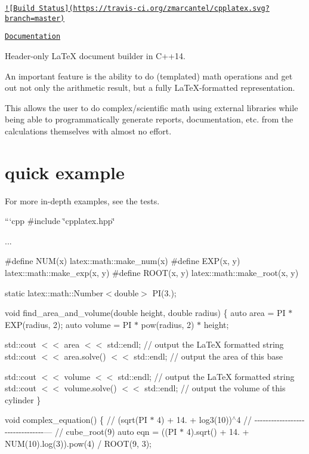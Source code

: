 \href{https://travis-ci.org/zmarcantel/cpplatex}{\tt !\mbox{[}Build Status\mbox{]}(https\-://travis-\/ci.\-org/zmarcantel/cpplatex.\-svg?branch=master)}

\href{https://zmarcantel.github.io/cpplatex}{\tt Documentation}

Header-\/only {\ttfamily La\-Te\-X} document builder in C++14.

An important feature is the ability to do (templated) math operations and get out not only the arithmetic result, but a fully {\ttfamily La\-Te\-X}-\/formatted representation.

This allows the user to do complex/scientific math using external libraries while being able to programmatically generate reports, documentation, etc. from the calculations themselves with almost no effort.

\section*{quick example}

For more in-\/depth examples, see the tests.

```cpp \#include \char`\"{}cpplatex.\-hpp\char`\"{}

...

\#define N\-U\-M(x) latex\-::math\-::make\-\_\-num(x) \#define E\-X\-P(x, y) latex\-::math\-::make\-\_\-exp(x, y) \#define R\-O\-O\-T(x, y) latex\-::math\-::make\-\_\-root(x, y)

static latex\-::math\-::\-Number$<$double$>$ P\-I(3.);

void find\-\_\-area\-\_\-and\-\_\-volume(double height, double radius) \{ auto area = P\-I $\ast$ E\-X\-P(radius, 2); auto volume = P\-I $\ast$ pow(radius, 2) $\ast$ height;

std\-::cout $<$$<$ area $<$$<$ std\-::endl; // output the La\-Te\-X formatted string std\-::cout $<$$<$ area.\-solve() $<$$<$ std\-::endl; // output the area of this base

std\-::cout $<$$<$ volume $<$$<$ std\-::endl; // output the La\-Te\-X formatted string std\-::cout $<$$<$ volume.\-solve() $<$$<$ std\-::endl; // output the volume of this cylinder \}

void complex\-\_\-equation() \{ // (sqrt(\-P\-I $\ast$ 4) + 14. + log3(10))$^\wedge$4 // -\/-\/-\/-\/-\/-\/-\/-\/-\/-\/-\/-\/-\/-\/-\/-\/-\/-\/-\/-\/-\/-\/-\/-\/-\/-\/-\/-\/-\/-\/-\/-\/--- // cube\-\_\-root(9) auto eqn = ((P\-I $\ast$ 4).sqrt() + 14. + N\-U\-M(10).log(3)).pow(4) / R\-O\-O\-T(9, 3);

